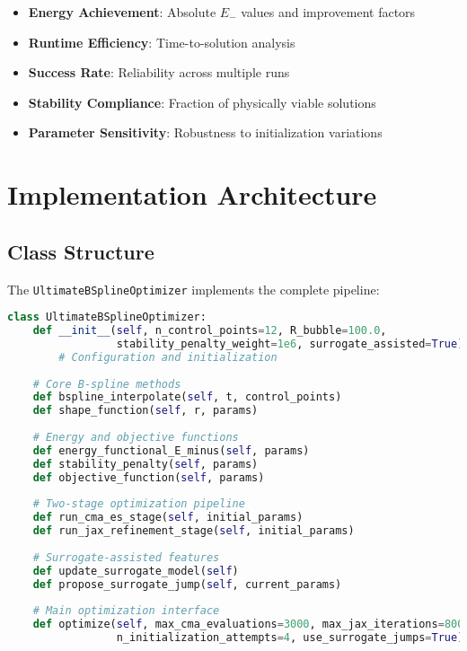 \documentclass[11pt,a4paper]{article}
\begin{document}
\begin{itemize}
\item \textbf{Energy Achievement}: Absolute $E_-$ values and improvement factors
\item \textbf{Runtime Efficiency}: Time-to-solution analysis
\item \textbf{Success Rate}: Reliability across multiple runs
\item \textbf{Stability Compliance}: Fraction of physically viable solutions
\item \textbf{Parameter Sensitivity}: Robustness to initialization variations
\end{itemize}

\section{Implementation Architecture}

\subsection{Class Structure}

The \texttt{UltimateBSplineOptimizer} implements the complete pipeline:

\begin{lstlisting}[language=Python, caption=Ultimate B-Spline Architecture]
class UltimateBSplineOptimizer:
    def __init__(self, n_control_points=12, R_bubble=100.0, 
                 stability_penalty_weight=1e6, surrogate_assisted=True):
        # Configuration and initialization
        
    # Core B-spline methods
    def bspline_interpolate(self, t, control_points)
    def shape_function(self, r, params)
    
    # Energy and objective functions
    def energy_functional_E_minus(self, params)
    def stability_penalty(self, params)
    def objective_function(self, params)
    
    # Two-stage optimization pipeline
    def run_cma_es_stage(self, initial_params)
    def run_jax_refinement_stage(self, initial_params)
    
    # Surrogate-assisted features
    def update_surrogate_model(self)
    def propose_surrogate_jump(self, current_params)
    
    # Main optimization interface
    def optimize(self, max_cma_evaluations=3000, max_jax_iterations=800,
                 n_initialization_attempts=4, use_surrogate_jumps=True)
\end{lstlisting}
\end{document}
